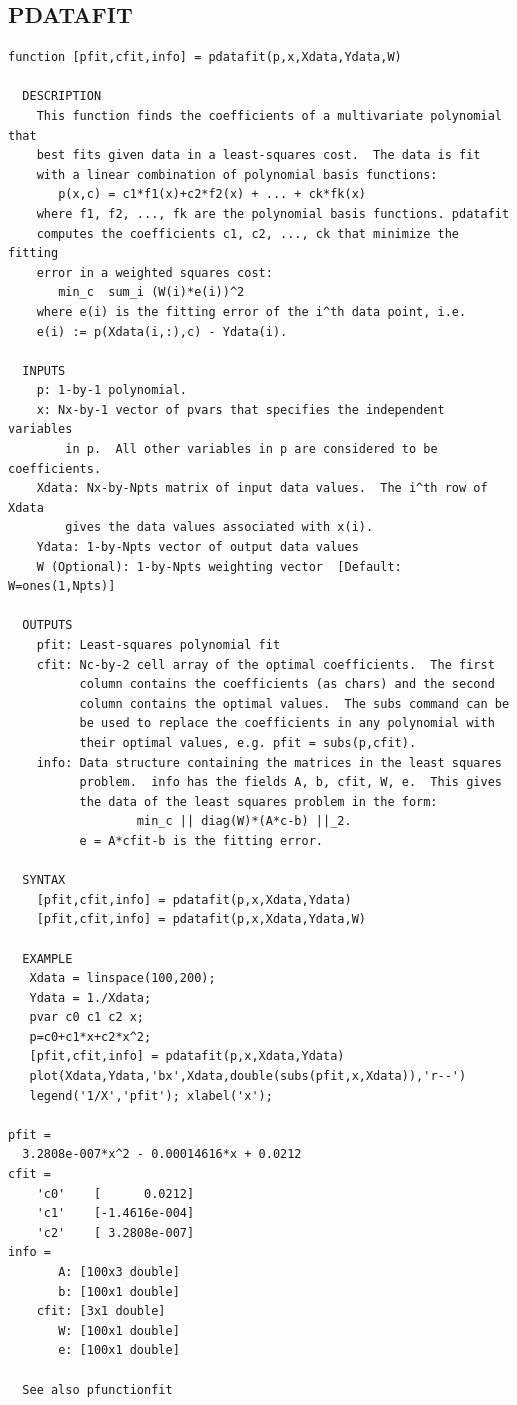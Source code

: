 \documentclass{article}
\begin{document}
\subsection{PDATAFIT}
\begin{verbatim}
function [pfit,cfit,info] = pdatafit(p,x,Xdata,Ydata,W)

  DESCRIPTION
    This function finds the coefficients of a multivariate polynomial that
    best fits given data in a least-squares cost.  The data is fit
    with a linear combination of polynomial basis functions:
       p(x,c) = c1*f1(x)+c2*f2(x) + ... + ck*fk(x)
    where f1, f2, ..., fk are the polynomial basis functions. pdatafit
    computes the coefficients c1, c2, ..., ck that minimize the fitting
    error in a weighted squares cost:
       min_c  sum_i (W(i)*e(i))^2
    where e(i) is the fitting error of the i^th data point, i.e.
    e(i) := p(Xdata(i,:),c) - Ydata(i).

  INPUTS
    p: 1-by-1 polynomial.
    x: Nx-by-1 vector of pvars that specifies the independent variables
        in p.  All other variables in p are considered to be coefficients.
    Xdata: Nx-by-Npts matrix of input data values.  The i^th row of Xdata
        gives the data values associated with x(i).
    Ydata: 1-by-Npts vector of output data values
    W (Optional): 1-by-Npts weighting vector  [Default: W=ones(1,Npts)]

  OUTPUTS
    pfit: Least-squares polynomial fit
    cfit: Nc-by-2 cell array of the optimal coefficients.  The first
          column contains the coefficients (as chars) and the second
          column contains the optimal values.  The subs command can be
          be used to replace the coefficients in any polynomial with
          their optimal values, e.g. pfit = subs(p,cfit).
    info: Data structure containing the matrices in the least squares
          problem.  info has the fields A, b, cfit, W, e.  This gives
          the data of the least squares problem in the form:
                  min_c || diag(W)*(A*c-b) ||_2.
          e = A*cfit-b is the fitting error.

  SYNTAX
    [pfit,cfit,info] = pdatafit(p,x,Xdata,Ydata)
    [pfit,cfit,info] = pdatafit(p,x,Xdata,Ydata,W)

  EXAMPLE
   Xdata = linspace(100,200);
   Ydata = 1./Xdata;
   pvar c0 c1 c2 x;
   p=c0+c1*x+c2*x^2;
   [pfit,cfit,info] = pdatafit(p,x,Xdata,Ydata)
   plot(Xdata,Ydata,'bx',Xdata,double(subs(pfit,x,Xdata)),'r--')
   legend('1/X','pfit'); xlabel('x');

pfit =
  3.2808e-007*x^2 - 0.00014616*x + 0.0212
cfit =
    'c0'    [      0.0212]
    'c1'    [-1.4616e-004]
    'c2'    [ 3.2808e-007]
info =
       A: [100x3 double]
       b: [100x1 double]
    cfit: [3x1 double]
       W: [100x1 double]
       e: [100x1 double]

  See also pfunctionfit

\end{verbatim}
\end{document}
